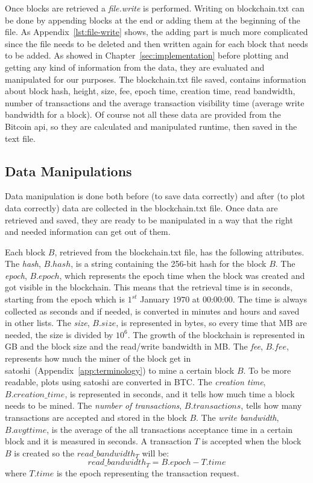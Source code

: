 \documentclass[USenglish]{uit-thesis}
\begin{document}
Once blocks are retrieved a \emph{file.write} is performed. Writing on blockchain.txt
can be done by appending blocks at the end or adding them at the beginning
of the file. As Appendix~\ref{lst:file-write} shows, the adding part is much more
complicated since the file needs to be deleted and then written again for each block
that needs to be added.
As showed in Chapter~\ref{sec:implementation} before plotting and getting any
kind of information from the data, they are evaluated and manipulated for our purposes.
The blockchain.txt file saved, contains information about block hash, height, size, fee, epoch
time, creation time, read bandwidth, number of transactions and the average transaction
visibility time (average write bandwidth for a block). Of course not all these data are
provided from the Bitcoin \gls{api}, so they are calculated and manipulated runtime, then saved in the text file.

\subsection{Data Manipulations}
Data manipulation is done both before (to save data correctly) and after
(to plot data correctly) data are collected in the
blockchain.txt file. Once data are retrieved and saved, they are ready to
be manipulated in a way that the right and needed information can get
out of them.

Each block $B$, retrieved from the blockchain.txt file, has the following attributes.
The \emph{hash}, $B.hash$, is a string containing the 256-bit hash for the block $B$.
The \emph{epoch}, $B.epoch$, which represents the epoch time when the block was created and
got visible in the blockchain. This means that the retrieval time is in seconds,
starting from the epoch which is $1^{st}$ January $1970$ at $00$:$00$:$00$. The time is
always collected as seconds and if needed, is converted in minutes and
hours and saved in other lists.
The \emph{size}, $B.size$, is represented in bytes, so every time that MB are needed, the
size is divided by $10^6$. The growth of the blockchain is represented in GB and
the block size and the read/write bandwidth in MB.
The \emph{fee}, $B.fee$, represents how much the miner of the block get in satoshi~(Appendix~\ref{app:terminology})
to mine a certain block $B$. To be more readable, plots using satoshi are converted in BTC.
The \emph{creation time}, $B.creation\_time$, is represented in seconds, and it tells how much time
a block needs to be mined.
The \emph{number of transactions}, $B.transactions$, tells how many transactions are accepted and
stored in the block $B$.
The \emph{write bandwidth}, $B.avgttime$, is the average of the all transactions acceptance time
in a certain block and it is measured in seconds. A transaction $T$ is accepted when the block $B$ is
created so the $read\_bandwidth_T$ will be:
\begin{equation}
\label{eq:read_bandwidth}
read\_bandwidth_T = B.epoch - T.time
\end{equation}
where $T.time$ is the epoch representing the transaction request.
\end{document}
